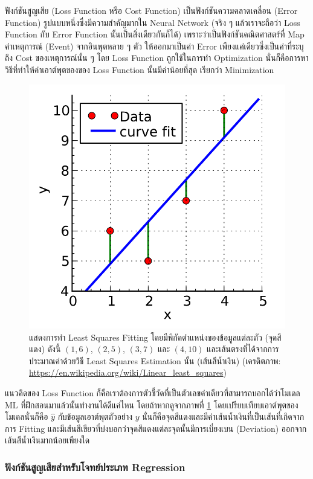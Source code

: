 ฟังก์ชันสูญเสีย (Loss Function หรือ Cost Function) เป็นฟังก์ชันความคลาดเคลื่อน (Error Function) รูปแบบหนึ่งซึ่งมีความสำคัญมากใน 
Neural Network (จริง ๆ แล้วเราจะถือว่า Loss Function กับ Error Function นั้นเป็นสิ่งเดียวกันก็ได้) เพราะว่าเป็นฟังก์ชันคณิตศาสตร์ที่ 
Map ค่าเหตุการณ์ (Event) จากอินพุตหลาย ๆ ตัว ให้ออกมาเป็นค่า Error เพียงแค่เดียวซึ่งเป็นค่าที่ระบุถึง Cost ของเหตุการณ์นั้น ๆ โดย Loss 
Function ถูกใช้ในการทำ Optimization นั่นก็คือการหาวิธีที่ทำให้ค่าเอาต์พุตของของ Loss Function นั้นมีค่าน้อยที่สุด เรียกว่า Minimization 

\begin{figure}[htbp]
    \centering
    \includegraphics[width=0.7\linewidth]{fig/least-squares-fitting.png}
    \caption{แสดงการทำ Least Squares Fitting โดยมีพิกัดตำแหน่งของข้อมูลแต่ละตัว (จุดสีแดง) ดังนี้ $(1,6)$, $(2,5)$, $(3,7)$ 
    และ $(4,10)$ และเส้นตรงที่ได้จากการประมาณค่าด้วยวิธี Least Squares Estimation นั้น (เส้นสีน้ำเงิน) (เครดิตภาพ: 
    \url{https://en.wikipedia.org/wiki/Linear_least_squares})}
    \label{fig:least_square_fitting}
\end{figure}

แนวคิดของ Loss Function ก็คือเราต้องการตัวชี้วัดที่เป็นตัวเลขค่าเดียวที่สามารถบอกได้ว่าโมเดล ML ที่ฝึกสอนมาแล้วนั้นทำงานได้ดีแค่ไหน 
โดยถ้าหากดูจากภาพที่ \ref{fig:least_square_fitting} โดยเปรียบเทียบเอาต์พุตของโมเดลนั่นก็คือ $\hat{y}$ กับข้อมูลเอาต์พุตตัวอย่าง 
$y$ นั่นก็คือจุดสีแดงและมีค่าเส้นน้ำเงินที่เป็นเส้นที่เกิดจากการ Fitting และมีเส้นสีเขียวที่บ่งบอกว่าจุดสีแดงแต่ละจุดนั้นมีการเบี่ยงเบน (Deviation) 
ออกจากเส้นสีน้ำเงินมากน้อยเพียงใด

\subsubsection{ฟังก์ชันสูญเสียสำหรับโจทย์ประเภท Regression}

